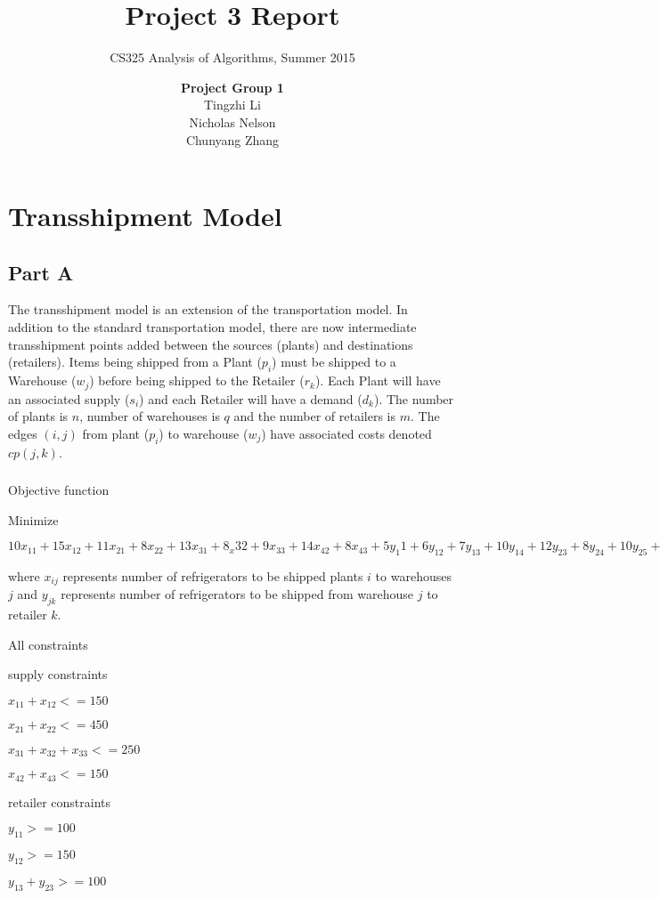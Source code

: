 \documentclass[11pt]{scrreprt}
\title{\textbf{Project 3 Report}}
\subtitle{CS325 Analysis of Algorithms, Summer 2015}
\author{\textsf{\textbf{Project Group 1}}\\
		\textsf{Tingzhi Li}\\
		\textsf{Nicholas Nelson}\\
		\textsf{Chunyang Zhang}}
\date{}
\begin{document}
\maketitle

\chapter{Transshipment Model}
\section{Part A}
The transshipment model is an extension of the transportation model. In addition to the standard transportation model, there are now intermediate transshipment points added between the sources (plants) and destinations (retailers). Items being shipped from a Plant ($p_i$) must be shipped to a Warehouse ($w_j$) before being shipped to the Retailer ($r_k$). Each Plant will have an associated supply ($s_i$) and each Retailer will have a demand ($d_k$). The number of plants is $n$, number of warehouses is $q$ and the number of retailers is $m$. The edges $(i,j)$ from plant ($p_i$) to warehouse ($w_j$) have associated costs denoted $cp(j,k)$.

\subsection{}
Objective function

Minimize

$10x_{11}+15x_{12}+11x_{21}+8x_{22}+13x_{31}+8_x{32}+9x_{33}+14x_{42}+8x_{43}+5y_{1}1+6y_{12}+7y_{13}+10y_{14}+12y_{23}+8y_{24}+10y_{25}+14y_{26}+12y_{35}+12y_{36}+6y_{37}$

where $x_{ij}$ represents number of refrigerators to be shipped plants $i$ to warehouses $j$ and $y_{jk}$ represents number of refrigerators to be shipped  from warehouse $j$ to retailer $k$.

All constraints

supply constraints

$x_{11} + x_{12} <= 150$

$x_{21} + x_{22} <= 450$

$x_{31} + x_{32} + x_{33} <= 250$

$x_{42} + x_{43} <= 150$

retailer constraints

$y_{11} >= 100$

$y_{12} >= 150$

$y_{13} + y_{23} >= 100$
\end{document}
